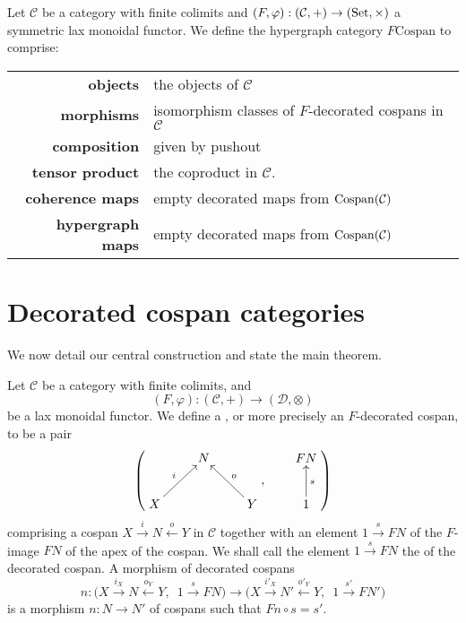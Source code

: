 \begin{definition} \label{thm:fcospanss}
  Let $\mathcal C$ be a category with finite colimits and $(F,\varphi):
  (\mathcal C,+) \to (\mathrm{Set}, \times)$ a symmetric lax monoidal functor. We define
  the hypergraph category $F\mathrm{Cospan}$ to comprise:

  \begin{tabular}{ r p{}}
    \textbf{objects} & the objects of $\mathcal C$ \\ 
    \textbf{morphisms} & isomorphism classes of $F$-decorated cospans in
    $\mathcal C$\\ 
  \textbf{composition} & given by pushout \\
  \textbf{tensor product} & the coproduct in $\mathcal C$. \\
  \textbf{coherence maps} & empty decorated maps from $\operatorname{{Cospan}}(\mathcal C)$ \\
  \textbf{hypergraph maps} & empty decorated maps from $\operatorname{{Cospan}}(\mathcal C)$
  \end{tabular}
\end{definition}

\section{Decorated cospan categories} \label{sec:dcc}

We now detail our central construction and state the main theorem.
\begin{definition} \label{def:fcospans}
  Let $\mathcal C$ be a category with finite colimits, and
  \[
    (F,\varphi)\colon  (\mathcal C,+) \longrightarrow (\mathcal D, \otimes)
  \]
  be a lax monoidal functor. We define a , or more
  precisely an $F$-decorated cospan, to be a pair 
  \[
    \left(
    \begin{aligned}
      \xymatrix{
	& N \\  
	X \ar[ur]^{i} && Y \ar[ul]_{o}
      }
    \end{aligned}
    ,
    \qquad
    \begin{aligned}
      \xymatrix{
	FN \\
	1 \ar[u]_{s}
      }
    \end{aligned}
    \right)
  \]
  comprising a cospan $X \stackrel{i}\rightarrow N \stackrel{o}\leftarrow Y$ in
  $\mathcal C$ together with an element $1 \stackrel{s}\rightarrow FN$ of
  the $F$-image $FN$ of the apex of the cospan. We shall call the element $1
  \stackrel{s}\rightarrow FN$ the  of the decorated
  cospan. A morphism of decorated cospans 
  \[
    n\colon  \big(X \stackrel{i_X}\longrightarrow N \stackrel{o_Y}\longleftarrow
    Y,\enspace 1 \stackrel{s}\longrightarrow FN\big) \longrightarrow \big(X
    \stackrel{i'_X}\longrightarrow N' \stackrel{o'_Y}\longleftarrow Y,\enspace 1
    \stackrel{s'}\longrightarrow FN'\big)
  \]
  is a morphism $n\colon  N \to N'$ of cospans such that $Fn \circ s = s'$.
\end{definition}

